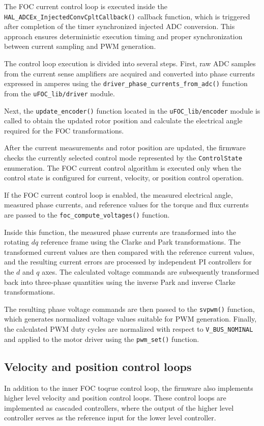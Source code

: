 The FOC current control loop is executed inside the \texttt{HAL\_ADCEx\_InjectedConvCpltCallback()} callback function,
which is triggered after completion of the timer synchronized injected ADC conversion.
This approach ensures deterministic execution timing and proper synchronization between current sampling and PWM generation.

The control loop execution is divided into several steps.
First, raw ADC samples from the current sense amplifiers are acquired and converted into phase currents expressed in amperes
using the \texttt{driver\_phase\_currents\_from\_adc()} function from the \texttt{uFOC\_lib/driver} module.

Next, the \texttt{update\_encoder()} function located in the \texttt{uFOC\_lib/encoder} module is called
to obtain the updated rotor position and calculate the electrical angle required for the FOC transformations.

After the current measurements and rotor position are updated,
the firmware checks the currently selected control mode represented by the \texttt{ControlState} enumeration.
The FOC current control algorithm is executed only when the control state is configured for current, velocity, or position control operation.

If the FOC current control loop is enabled, the measured electrical angle, measured phase currents,
and reference values for the torque and flux currents are passed to the \texttt{foc\_compute\_voltages()} function.

Inside this function, the measured phase currents are transformed into the rotating $dq$ reference frame using the Clarke and Park transformations.
The transformed current values are then compared with the reference current values,
and the resulting current errors are processed by independent PI controllers for the $d$ and $q$ axes.
The calculated voltage commands are subsequently transformed back into three-phase quantities
using the inverse Park and inverse Clarke transformations.

The resulting phase voltage commands are then passed to the \texttt{svpwm()} function,
which generates normalized voltage values suitable for PWM generation.
Finally, the calculated PWM duty cycles are normalized with respect to \texttt{V\_BUS\_NOMINAL}
and applied to the motor driver using the \texttt{pwm\_set()} function.

\subsection{Velocity and position control loops}
In addition to the inner FOC toqrue control loop, the firmware also implements higher level velocity and position control loops.
These control loops are implemented as cascaded controllers, where the output of the higher level controller serves as the reference input for the lower level controller.

